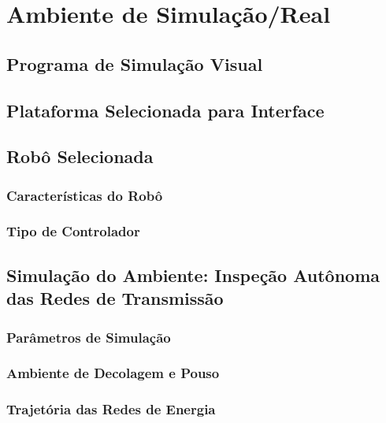 \chapter{Ambiente de Simulação/Real}

\section{Programa de Simulação Visual}

\section{Plataforma Selecionada para Interface}

\section{Robô Selecionada}

	\subsection{Características do Robô}

	\subsection{Tipo de Controlador}
    
\section{Simulação do Ambiente: Inspeção Autônoma das Redes de Transmissão}

	\subsection{Parâmetros de Simulação}
    
    \subsection{Ambiente de Decolagem e Pouso}
    
    \subsection{Trajetória das Redes de Energia}